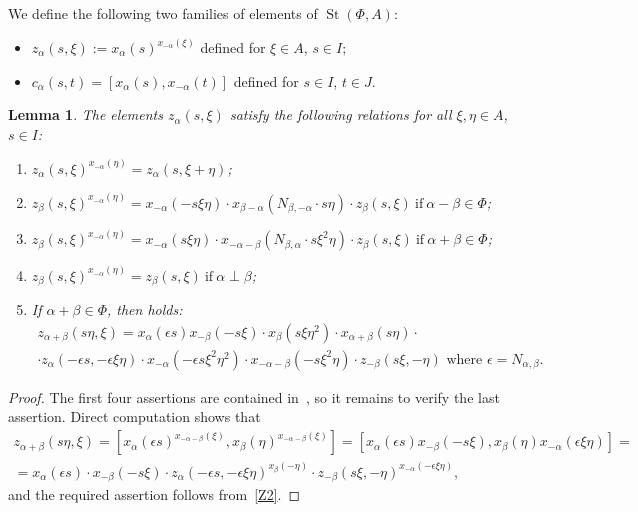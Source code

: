 \documentclass[oneside, 8pt]{amsart}
\newtheorem{lemma}{Lemma}
\theoremstyle{remark}
\theoremstyle{definition}
\DeclareMathOperator{\St}{St}
\numberwithin{equation}{section}
\begin{document}
We define the following two families of elements of $\St(\Phi, A)$:
\begin{itemize}
 \item $z_\alpha(s, \xi) := x_\alpha(s)^{x_{-\alpha}(\xi)}$ defined for $\xi \in A$, $s \in I$;
 \item $c_\alpha(s, t) = [x_\alpha(s), x_{-\alpha}(t)]$ defined for $s \in I$, $t \in J$.
\end{itemize}

\begin{lemma}\label{Zrels} The elements $z_\alpha(s, \xi)$ satisfy the following relations for all $\xi, \eta\in A$, $s\in I$:
\begin{enumerate} 
\item\label{Z1} $z_{\alpha}(s, \xi) ^ {x_{-\alpha}(\eta)} = z_{\alpha}(s, \xi + \eta)$;
\item\label{Z2} $z_{\beta}(s, \xi) ^ {x_{-\alpha}(\eta)} = x_{-\alpha} (- s\xi \eta) \cdot x_{\beta-\alpha} (N_{\beta, -\alpha}\cdot s\eta)     \cdot z_{\beta}(s, \xi)\ \text{if}\ \alpha - \beta \in \Phi$;
\item\label{Z3} $z_{\beta}(s, \xi) ^ {x_{-\alpha}(\eta)} = x_{-\alpha} (s\xi \eta) \cdot x_{-\alpha-\beta} (N_{\beta,\alpha}\cdot s\xi^2\eta) \cdot z_{\beta}(s, \xi)\ \text{if}\ \alpha + \beta \in \Phi$;
\item\label{Z4} $z_{\beta}(s, \xi) ^ {x_{-\alpha}(\eta)} = z_{\beta}(s, \xi)\ \text{if}\ \alpha\perp\beta$;
\item\label{Z5} If $\alpha+\beta\in\Phi$, then holds:
\begin{multline} \nonumber z_{\alpha+\beta}(s\eta, \xi) = x_\alpha(\epsilon s) x_{-\beta}(-s\xi) \cdot x_{\beta}(s\xi\eta^2) \cdot x_{\alpha+\beta}(s \eta) \cdot \\ \cdot z_\alpha(-\epsilon s, -\epsilon \xi\eta) \cdot
  x_{-\alpha}(-\epsilon s\xi^2\eta^2) \cdot x_{-\alpha-\beta}(- s \xi^2 \eta) \cdot z_{-\beta}(s\xi, -\eta)\text{ where $\epsilon = N_{\alpha,\beta}$.}\end{multline}
\end{enumerate} \end{lemma}
\begin{proof}
The first four assertions are contained in~\cite[Lemma~9]{S15}, so it remains to verify the last assertion.
Direct computation shows that
\begin{multline} \nonumber
  z_{\alpha+\beta}(s\eta, \xi) = [x_\alpha(\epsilon s)^{x_{-\alpha-\beta}(\xi)}, x_\beta(\eta)^{x_{-\alpha-\beta}(\xi)}] =
  [x_\alpha(\epsilon s) x_{-\beta}(-s\xi), x_{\beta}(\eta) x_{-\alpha}(\epsilon \xi\eta)] = \\ 
  = x_\alpha(\epsilon s) \cdot x_{-\beta}(-s\xi) \cdot z_\alpha(-\epsilon s, -\epsilon \xi\eta)^{x_{\beta}(-\eta)} \cdot z_{-\beta}(s\xi, -\eta)^{x_{-\alpha}(-\epsilon \xi\eta)},
\end{multline} 
and the required assertion follows from~\eqref{Z2}.
\end{proof}
\end{document}
